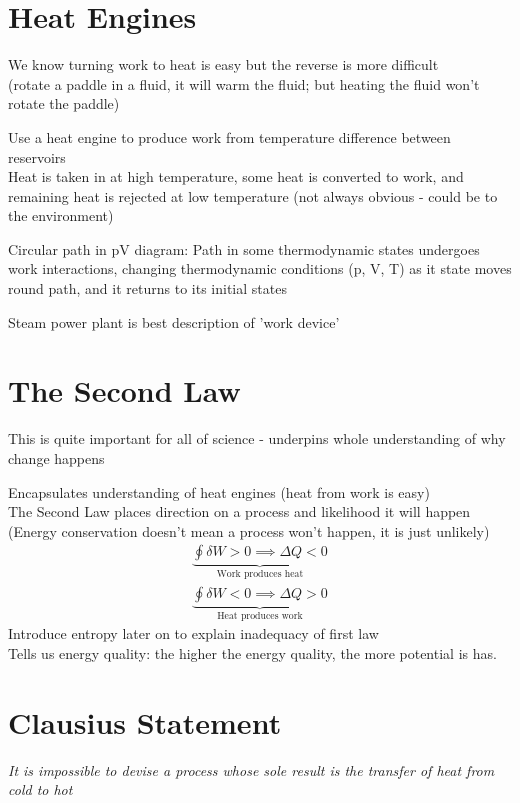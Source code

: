 \documentclass[a4paper, 11pt, normalem]{report}
\begin{document}
\section{Heat Engines}
We know turning work to heat is easy but the reverse is more difficult \\
(rotate a paddle in a fluid, it will warm the fluid; but heating the fluid won't rotate the paddle)

Use a heat engine to produce work from temperature difference between reservoirs \\
Heat is taken in at high temperature, some heat is converted to work, and remaining heat is rejected at low temperature (not always obvious - could be to the environment)

Circular path in pV diagram: Path in some thermodynamic states undergoes work interactions, changing thermodynamic conditions (p, V, T) as it state moves round path, and it returns to its initial states

Steam power plant is best description of 'work device'

\section{The Second Law}
This is quite important for all of science - underpins whole understanding of why change happens

Encapsulates understanding of heat engines (heat from work is easy) \\
The Second Law places direction on a process and likelihood it will happen \\
(Energy conservation doesn't mean a process won't happen, it is just unlikely)
\begin{gather*}
    \underbrace{\oint \delta W > 0 \implies \Delta Q < 0}_{\text{Work produces heat}} \\
    \underbrace{\oint \delta W < 0 \implies \Delta Q > 0}_{\text{Heat produces work}}
\end{gather*}
Introduce entropy later on to explain inadequacy of first law \\
Tells us energy quality: the higher the energy quality, the more potential is has.

\section{Clausius Statement}
\emph{It is impossible to devise a process whose sole result is the transfer of heat from cold to hot}
\end{document}
